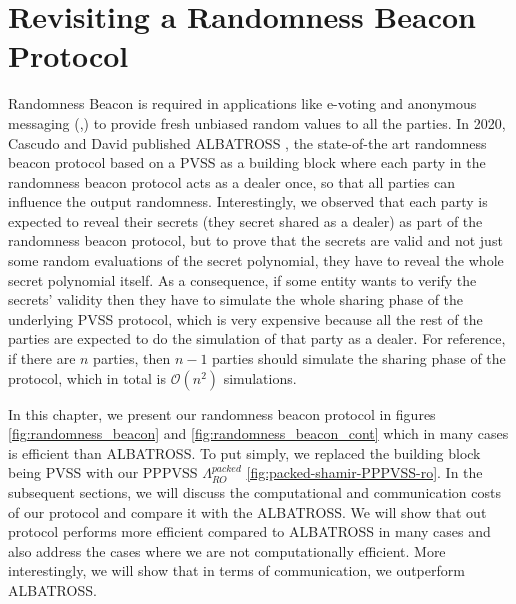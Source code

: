 \chapter{Revisiting a Randomness Beacon Protocol}
\label{cha:n}

Randomness Beacon \cite{RABIN1983256} is required in applications like e-voting \cite{10.5555/1496711.1496734} 
and anonymous messaging (\cite{180263},\cite{10.1145/2815400.2815417}) to provide fresh unbiased random values to all the 
parties. In 2020, Cascudo and David published ALBATROSS \cite{cryptoeprint:2020/644}, the state-of-the art randomness 
beacon protocol based on a PVSS as a building block where each party in the randomness beacon protocol acts as a dealer once, so that all 
parties can influence the output randomness. Interestingly, we observed that each party is expected to reveal 
their secrets (they secret shared as a dealer) as part of the randomness beacon protocol, but to prove that the 
secrets are valid and not just some random evaluations of the secret polynomial, they have to reveal the whole 
secret polynomial itself. As a consequence, if some entity wants to verify the secrets' validity then they have to 
simulate the whole sharing phase of the underlying PVSS protocol, which is very expensive because all the rest of the 
parties are expected to do the simulation of that party as a dealer. For reference, if there are $n$ parties, then 
$n-1$ parties should simulate the sharing phase of the protocol, which in total is $\mathcal{O}(n^2)$ simulations.\par

In this chapter, we present our randomness beacon protocol in figures \ref{fig:randomness_beacon} and \ref{fig:randomness_beacon_cont} 
which in many cases is efficient than ALBATROSS. To put simply, we replaced the building block being PVSS with 
our PPPVSS $\Lambda_{RO}^{packed}$ \ref{fig:packed-shamir-PPPVSS-ro}. In the subsequent sections, we will discuss the 
computational and communication costs of our protocol and compare it with the ALBATROSS. We will show that out protocol 
performs more efficient compared to ALBATROSS in many cases and also address the cases where we are not computationally efficient.
More interestingly, we will show that in terms of communication, we outperform ALBATROSS.



